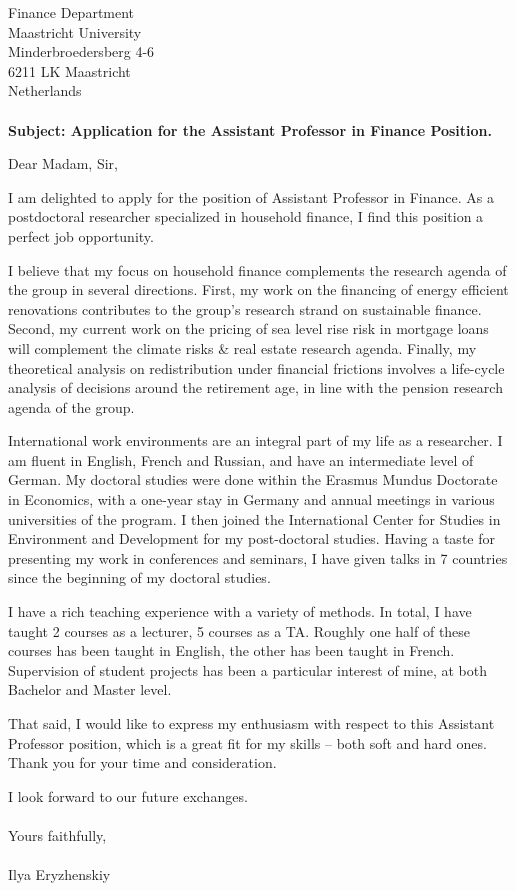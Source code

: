 \documentclass{letter}
\begin{document}
\begin{letter}{Finance Department \\ 
Maastricht University \\
Minderbroedersberg 4-6 \\
6211 LK Maastricht\\
Netherlands \\
  ~ \\ \textbf{Subject: Application for the Assistant Professor  in Finance Position.}}
\opening{Dear Madam, Sir,}

I am delighted to apply for the position of Assistant Professor in Finance. As a postdoctoral researcher specialized in household finance, I find this position a perfect job opportunity. 

I believe that my focus on household finance complements the research agenda of the group in several directions. First, my work on the financing of energy efficient renovations contributes to the group's research strand on sustainable finance. Second, my current work on the pricing of sea level rise risk in mortgage loans will complement the climate risks \& real estate research agenda. Finally, my theoretical analysis on redistribution under financial frictions involves a life-cycle analysis of decisions around the retirement age, in line with the pension research agenda of the group.       

International work environments are an integral part of my life as a researcher. I am fluent in English, French and Russian, and have an intermediate level of German. My doctoral studies were done within the Erasmus Mundus Doctorate in Economics, with a one-year stay in Germany and annual meetings in various universities of the program. I then joined the International Center for Studies in Environment and Development for my post-doctoral studies. Having a taste for presenting my work in conferences and seminars, I have given talks in 7 countries since the beginning of my doctoral studies. 


I have a rich teaching experience with a variety of methods. In total, I have taught 2 courses as a lecturer, 5 courses as a TA. Roughly one half of these courses has been taught in English, the other has been taught in French. Supervision of student projects has been a particular interest of mine, at both Bachelor and Master level.

That said, I would like to express my enthusiasm with respect to this Assistant Professor position, which is a great fit for my skills -- both soft and hard ones.  
Thank you for your time and consideration.

I look forward to our future exchanges. \\
~ \\
    
{Yours faithfully, \\
~ \\
Ilya Eryzhenskiy}

\end{letter}
\end{document}
